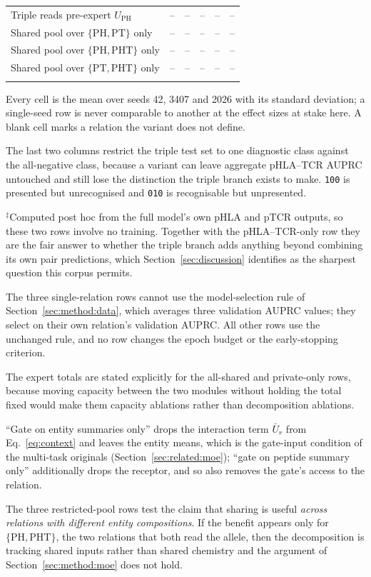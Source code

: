 \documentclass[webpdf,modern,large,namedate]{oup-authoring-template}
\theoremstyle{thmstyleone}
\theoremstyle{thmstyletwo}
\theoremstyle{thmstylethree}
\newcommand{\NA}{--}
\newcommand{\PH}{pHLA}
\newcommand{\PT}{pTCR}
\newcommand{\PHT}{pHLA--TCR}
\newcommand{\PHm}{\mathrm{PH}}
\newcommand{\PTm}{\mathrm{PT}}
\newcommand{\PHTm}{\mathrm{PHT}}
\begin{document}
\begin{table}[!t]
\begin{tabular*}{\textwidth}{@{\extracolsep{\fill}}lccccc@{\extracolsep{\fill}}}
Triple reads pre-expert $U_{\PHm}$     & \NA & \NA & \NA & \NA & \NA\\
Shared pool over $\{\PHm,\PTm\}$ only  & \NA & \NA & \NA & \NA & \NA\\
Shared pool over $\{\PHm,\PHTm\}$ only & \NA & \NA & \NA & \NA & \NA\\
Shared pool over $\{\PTm,\PHTm\}$ only & \NA & \NA & \NA & \NA & \NA\\
\botrule
\end{tabular*}
\begin{tablenotes}%
\item Every cell is the mean over seeds 42, 3407 and 2026 with its standard
deviation; a single-seed row is never comparable to another at the effect sizes
at stake here. A blank cell marks a relation the variant does not define.
\item The last two columns restrict the triple test set to one diagnostic class
against the all-negative class, because a variant can leave aggregate \PHT{}
AUPRC untouched and still lose the distinction the triple branch exists to
make. \texttt{100} is presented but unrecognised and \texttt{010} is
recognisable but unpresented.
\item $^{\ddag}$Computed post hoc from the full model's own \PH{} and \PT{}
outputs, so these two rows involve no training. Together with the
\PHT{}-only row they are the fair answer to whether the triple branch adds
anything beyond combining its own pair predictions, which
Section~\ref{sec:discussion} identifies as the sharpest question this corpus
permits.
\item The three single-relation rows cannot use the model-selection rule of
Section~\ref{sec:method:data}, which averages three validation AUPRC
values; they select on their own relation's validation AUPRC. All other rows
use the unchanged rule, and no row changes the epoch budget or the
early-stopping criterion.
\item The expert totals are stated explicitly for the all-shared and
private-only rows, because moving capacity between the two modules without
holding the total fixed would make them capacity ablations rather than
decomposition ablations.
\item ``Gate on entity summaries only'' drops the interaction term
$\bar U_r$ from Eq.~\eqref{eq:context} and leaves the entity means, which is
the gate-input condition of the multi-task originals
(Section~\ref{sec:related:moe}); ``gate on peptide summary only'' additionally
drops the receptor, and so also removes the gate's access to the relation.
\item The three restricted-pool rows test the claim that sharing is useful
\emph{across relations with different entity compositions}. If the benefit
appears only for $\{\PHm,\PHTm\}$, the two relations that both read the
allele, then the decomposition is tracking shared inputs rather than shared
chemistry and the argument of Section~\ref{sec:method:moe} does not hold.
\end{tablenotes}
\end{table}
\end{document}
